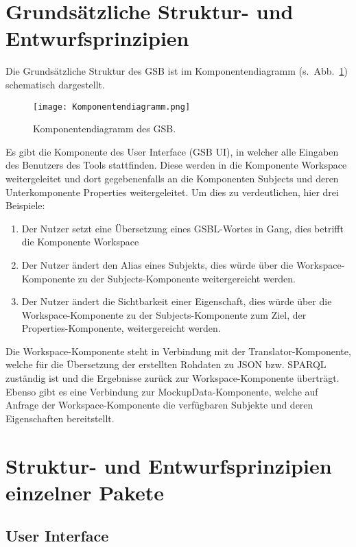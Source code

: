 \section{Grundsätzliche Struktur- und Entwurfsprinzipien}

Die Grundsätzliche Struktur des GSB ist im Komponentendiagramm
(s.~Abb.~\ref{fig02}) schematisch dargestellt.

\begin{figure}[h]%
\texttt{[image: Komponentendiagramm.png]}
\caption{Komponentendiagramm des GSB.}
\label{fig02}
\end{figure}


Es gibt die Komponente des User Interface (GSB UI), in welcher alle
Eingaben des Benutzers des Tools stattfinden. Diese werden in die
Komponente Workspace weitergeleitet und dort gegebenenfalls an die
Komponenten Subjects und deren Unterkomponente Properties
weitergeleitet. Um dies zu verdeutlichen, hier drei Beispiele:
\begin{enumerate}
\item Der Nutzer setzt eine Übersetzung eines GSBL-Wortes in Gang, dies betrifft die Komponente {\glqq}Workspace{\grqq}
\item Der Nutzer ändert den Alias eines Subjekts, dies würde über die Workspace-Komponente zu der Subjects-Komponente weitergereicht werden.
\item Der Nutzer ändert die Sichtbarkeit einer Eigenschaft, dies würde über die Workspace-Komponente zu der Subjects-Komponente zum Ziel, der Properties-Komponente, weitergereicht werden.
\end{enumerate}
Die Workspace-Komponente steht in Verbindung mit der
Translator-Komponente, welche für die Übersetzung der erstellten
Rohdaten zu JSON bzw. SPARQL zuständig ist und die Ergebnisse zurück
zur Workspace-Komponente überträgt.
Ebenso gibt es eine Verbindung zur MockupData-Komponente, welche auf
Anfrage der Workspace-Komponente die verfügbaren Subjekte und deren
Eigenschaften bereitstellt.


\section{Struktur- und Entwurfsprinzipien einzelner Pakete}

\subsection*{User Interface}

